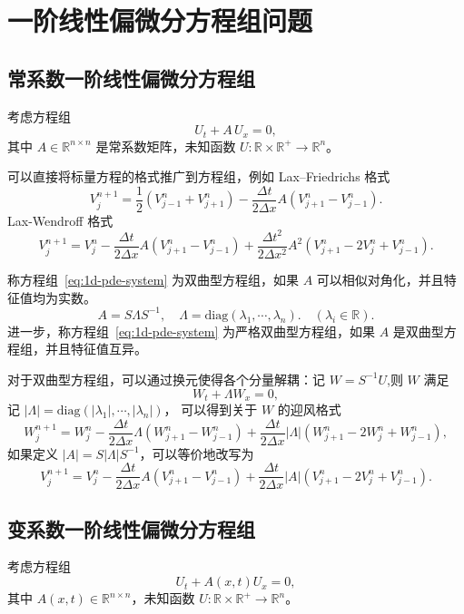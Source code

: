 \section{一阶线性偏微分方程组问题}

\subsection*{常系数一阶线性偏微分方程组}

考虑方程组
\begin{equation}
    U_t + A\, U_x = 0,    \label{eq:1d-pde-system}
\end{equation}
其中 $A \in \mathbb{R}^{n \times n}$ 是常系数矩阵，未知函数 $U: \mathbb{R}\times \mathbb{R}^+ \to \mathbb{R}^n$。

可以直接将标量方程的格式推广到方程组，例如 Lax–Friedrichs 格式
\[
    V_j^{n+1} = \frac12(V_{j-1}^n + V_{j+1}^n) - \frac{\Delta t}{2\Delta x} A (V_{j+1}^n - V_{j-1}^n).
\]
Lax-Wendroff 格式
\[
    V_j^{n+1} = V_j^n - \frac{\Delta t}{2\Delta x} A (V_{j+1}^n - V_{j-1}^n)
    + \frac{\Delta t^2}{2\Delta x^2} A^2(V_{j+1}^n - 2 V_j^n + V_{j-1}^n).
\]

\begin{definition}
    称方程组~\eqref{eq:1d-pde-system} 为双曲型方程组，如果 $A$ 可以相似对角化，并且特征值均为实数。
    \[
        A = S \Lambda S^{-1},\quad
        \Lambda = \text{diag}(\lambda_1,\cdots,\lambda_n).\quad (\lambda_i \in \mathbb{R}).
    \]
    进一步，称方程组~\eqref{eq:1d-pde-system} 为严格双曲型方程组，如果 $A$ 是双曲型方程组，并且特征值互异。
\end{definition}

对于双曲型方程组，可以通过换元使得各个分量解耦：记 $W = S^{-1} U$,则 $W$ 满足
\[
    W_t + \Lambda W_x = 0,
\]
记 $|\Lambda| = \text{diag}(|\lambda_1|,\cdots,|\lambda_n|)$，
可以得到关于 $W$ 的迎风格式
\[
    W_j^{n+1} = W_j^n
    - \frac{\Delta t}{2\Delta x} \Lambda (W_{j+1}^n - W_{j-1}^n)
    + \frac{\Delta t}{2\Delta x} |\Lambda|(W_{j+1}^n - 2 W_j^n + W_{j-1}^n),
\]
如果定义 $|A| = S |\Lambda| S^{-1}$，可以等价地改写为
\[
    V_j^{n+1} = V_j^n
    - \frac{\Delta t}{2\Delta x} A (V_{j+1}^n - V_{j-1}^n)
    + \frac{\Delta t}{2\Delta x} |A| (V_{j+1}^n - 2 V_j^n + V_{j-1}^n).
\]

\subsection*{变系数一阶线性偏微分方程组}

考虑方程组
\begin{equation}
    U_t + A(x,t) U_x = 0,    \label{eq:1d-pde-system-var}
\end{equation}
其中 $A(x,t) \in \mathbb{R}^{n \times n}$，未知函数 $U: \mathbb{R}\times \mathbb{R}^+ \to \mathbb{R}^n$。


